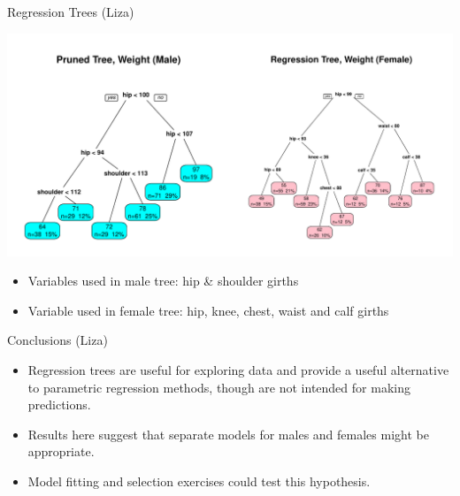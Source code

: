 \documentclass[table]{beamer}\usepackage[]{graphicx}\usepackage[]{color}
\makeatletter
\def\maxwidth{ %
  \ifdim\Gin@nat@width>\linewidth
    \linewidth
  \else
    \Gin@nat@width
  \fi
}
\newenvironment{knitrout}{}{} %
\makeatother
\begin{document}

\begin{frame}{Regression Trees (Liza)}




\begin{knitrout}
\color{fgcolor}
\includegraphics[width=\maxwidth]{figure/mf_plots} 

\end{knitrout}


\begin{itemize}
  \item Variables used in male tree: hip \& shoulder girths
  \item Variable used in female tree: hip, knee, chest, waist and calf girths
\end{itemize}

\end{frame}


\begin{frame}{Conclusions (Liza)}

\begin{itemize}
    \item Regression trees are useful for exploring data and provide a useful alternative to parametric regression methods, though are not intended for making predictions.
  \item Results here suggest that separate models for males and females might be appropriate.
  \item Model fitting and selection exercises could test this hypothesis.
\end{itemize}

\end{frame}
\end{document}
